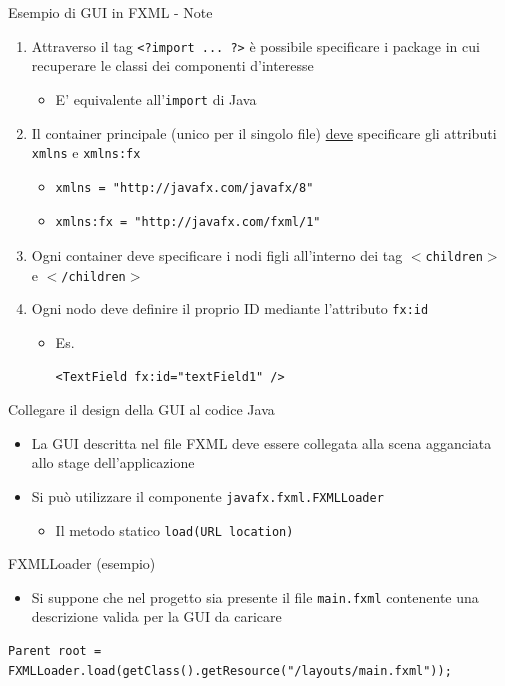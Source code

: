 \documentclass[presentation]{beamer}
\begin{document}
\begin{frame}[fragile]{Esempio di GUI in FXML - Note}
\begin{enumerate}\itemsep15pt
\item Attraverso il tag \texttt{<?import ... ?>} è possibile specificare i package in cui recuperare le classi dei componenti d'interesse
\begin{itemize}
\item E' equivalente all'\texttt{import} di Java
\end{itemize}
\item Il container principale (unico per il singolo file) \underline{deve} specificare gli attributi \texttt{xmlns} e \texttt{xmlns:fx}
\begin{itemize}
\item \begin{verbatim}xmlns = "http://javafx.com/javafx/8"\end{verbatim}
\item \begin{verbatim}xmlns:fx = "http://javafx.com/fxml/1"\end{verbatim}
\end{itemize}
\item Ogni container deve specificare i nodi figli all'interno dei tag \texttt{$<$children$>$} e \texttt{$<$/children$>$}
\item Ogni nodo deve definire il proprio ID mediante l'attributo \texttt{fx:id}
\begin{itemize}
\item Es. \begin{verbatim}<TextField fx:id="textField1" />\end{verbatim}
\end{itemize}
\end{enumerate}
\end{frame}

\begin{frame}[fragile]{Collegare il design della GUI al codice Java}
\begin{itemize}\itemsep10pt
\item La GUI descritta nel file FXML deve essere collegata alla scena agganciata allo stage dell'applicazione
\item Si può utilizzare il componente \texttt{javafx.fxml.FXMLLoader}
\begin{itemize}
\item Il metodo statico \texttt{load(URL location)} 
\end{itemize}
\end{itemize}
\begin{block}{FXMLLoader (esempio)}
\begin{itemize}
\item Si suppone che nel progetto sia presente il file \texttt{main.fxml} contenente una descrizione valida per la GUI da caricare
\end{itemize}
\begin{lstlisting}
Parent root = FXMLLoader.load(getClass().getResource("/layouts/main.fxml"));
\end{lstlisting}
\end{block}
\end{frame}
\end{document}
